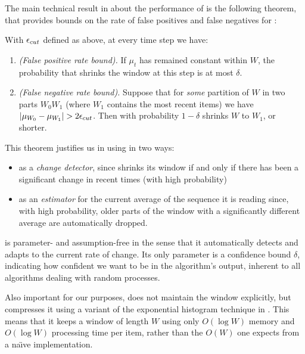 The main technical result in \cite{bif-gav} about the performance of \adwin is
the following theorem, that provides bounds on the rate of false
positives and false negatives for \adwinb: 

\begin{theorem}
\label{ThBV}
With $\epsilon_{cut}$ defined as above, 
at every time step we have:

\begin{enumerate}
\item {\em (False positive rate bound).} If $\mu_t$ has remained constant within $W$, 
the probability that \adwin shrinks the window 
at this step is at most $\delta$.

\item {\em (False negative rate bound).} 
Suppose that for {\em some} partition of $W$ in two parts $W_0W_1$ 
(where $W_1$ contains the most recent items) 
we have $|\mu_{W_0}-\mu_{W_1}| > 2\epsilon_{cut}$. 
Then with probability $1-\delta$ \adwin
shrinks $W$ to $W_1$, or shorter.
\end{enumerate}
\end{theorem}

\noindent
This theorem justifies us in using \adwin in two ways: 

\begin{itemize}
\item as a {\em change detector}, since \adwin shrinks its window
if and only if there has been a significant change in recent times
(with high probability)
\item as an {\em estimator} for the current average of the
sequence it is reading since, with high probability, older parts of the window
with a significantly different average are automatically dropped. 
\end{itemize}

\noindent


\adwin is parameter- and assumption-free in the sense that 
it automatically detects and adapts to the current rate of change. 
Its only parameter is a confidence bound $\delta$,
indicating how confident we want to be in the algorithm's output, 
inherent to all algorithms dealing with random processes. 

Also important for our purposes, \adwin does not maintain the window
explicitly, but compresses it using a variant of the exponential histogram
technique in \cite{babcock-sampling}. This means that it keeps a window of length $W$
using only $O(\log W)$ memory and $O(\log W)$ processing time per item, 
rather than the $O(W)$ one expects from a na{\"\i}ve implementation. 
\ENDOMIT

